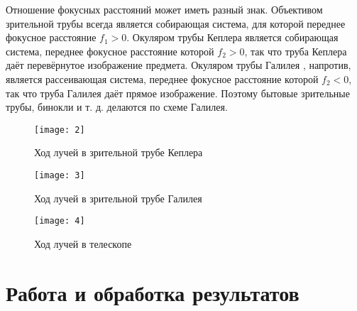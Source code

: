 \documentclass{letask}
\begin{document}
Отношение фокусных расстояний может иметь
разный знак. Объективом зрительной трубы всегда является собирающая система, для которой переднее фокусное расстояние $f_1 > 0$. Окуляром трубы Кеплера является собирающая система,
переднее фокусное расстояние которой $f_2 > 0$, так что труба Кеплера даёт перевёрнутое изображение предмета. Окуляром трубы Галилея
, напротив, является рассеивающая система, переднее фокусное расстояние которой $f_2 < 0$, так что труба Галилея даёт прямое
изображение. Поэтому бытовые зрительные трубы, бинокли и т. д. делаются по схеме Галилея.

\begin{figure}[H]
\centering
\texttt{[image: 2]}
\caption{Ход лучей в зрительной трубе Кеплера}
\end{figure}

\begin{figure}[H]
\centering
\texttt{[image: 3]}
\caption{Ход лучей в зрительной трубе Галилея}
\end{figure}

\begin{figure}[H]
\centering
\texttt{[image: 4]}
\caption{Ход лучей в телескопе}
\end{figure}

\section{Работа и обработка результатов}
\end{document}
